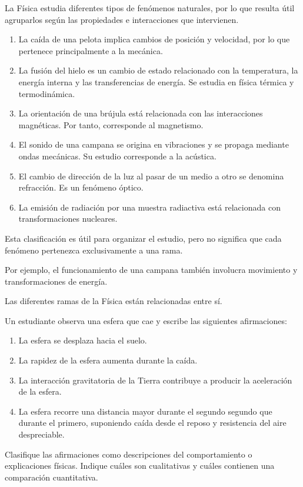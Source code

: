 \begin{explicacion}
La Física estudia diferentes tipos de fenómenos naturales, por lo que resulta útil agruparlos según las propiedades e interacciones que intervienen.

\begin{enumerate}[label=\alph*)]
    \item La caída de una pelota implica cambios de posición y velocidad, por lo que pertenece principalmente a la mecánica.

    \item La fusión del hielo es un cambio de estado relacionado con la temperatura, la energía interna y las transferencias de energía. Se estudia en física térmica y termodinámica.

    \item La orientación de una brújula está relacionada con las interacciones magnéticas. Por tanto, corresponde al magnetismo.

    \item El sonido de una campana se origina en vibraciones y se propaga mediante ondas mecánicas. Su estudio corresponde a la acústica.

    \item El cambio de dirección de la luz al pasar de un medio a otro se denomina refracción. Es un fenómeno óptico.

    \item La emisión de radiación por una muestra radiactiva está relacionada con transformaciones nucleares.
\end{enumerate}

Esta clasificación es útil para organizar el estudio, pero no significa que cada fenómeno pertenezca exclusivamente a una rama.

Por ejemplo, el funcionamiento de una campana también involucra movimiento y transformaciones de energía.

Las diferentes ramas de la Física están relacionadas entre sí.
\end{explicacion}


\begin{ejercicio}
Un estudiante observa una esfera que cae y escribe las siguientes afirmaciones:

\begin{enumerate}[label=\alph*)]
    \item La esfera se desplaza hacia el suelo.
    \item La rapidez de la esfera aumenta durante la caída.
    \item La interacción gravitatoria de la Tierra contribuye a producir la aceleración de la esfera.
    \item La esfera recorre una distancia mayor durante el segundo segundo que durante el primero, suponiendo caída desde el reposo y resistencia del aire despreciable.
\end{enumerate}

Clasifique las afirmaciones como descripciones del comportamiento o explicaciones físicas. Indique cuáles son cualitativas y cuáles contienen una comparación cuantitativa.
\end{ejercicio}

